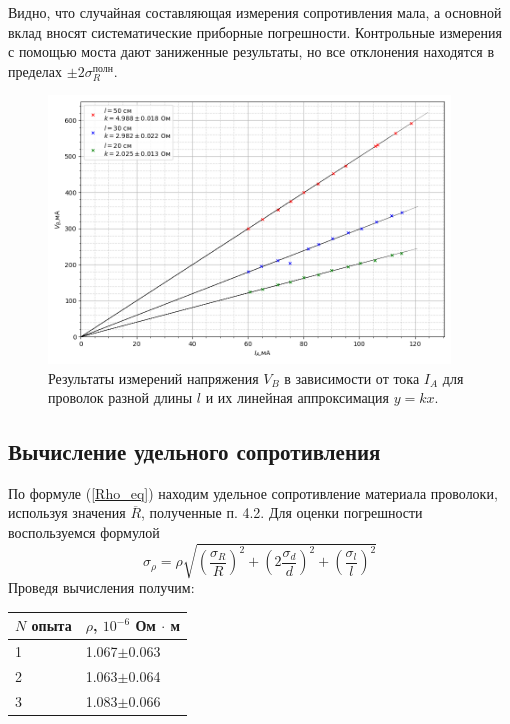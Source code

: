 \documentclass[12pt,a4paper]{article}
\begin{document}
Видно, что случайная составляющая измерения сопротивления мала, а основной вклад вносят систематические приборные погрешности. Контрольные измерения с помощью моста дают
заниженные результаты, но все отклонения находятся в пределах $\pm2 \sigma ^{полн} _{R}$.
\begin{figure}[htbp]
\includegraphics[width=0.95\textwidth]{imgs/graphic.png}
\caption{Результаты измерений напряжения $V_B$ в зависимости от тока $I_A$ для проволок разной длины $l$ и
их линейная аппроксимация $y=kx$.}
\label{fig:graphic}
\end{figure}

\subsection{ Вычисление удельного сопротивления}
По формуле (\ref{Rho_eq}) находим удельное сопротивление материала проволоки, используя значения
$\overline{R}$, полученные п. 4.2. Для оценки погрешности воспользуемся формулой
\begin{equation}
    \sigma _{\rho} = \rho\sqrt{ \left( \frac{\sigma _R}{R} \right)^2 + \left( 2\frac{\sigma _d}{d} \right)^2 +\left( \frac{\sigma _l}{l} \right)^2 }
\end{equation}
Проведя вычисления получим:
\begin{table}[!ht]
    \quad\quad\begin{tabular}{|l|l|}
    \hline
    $N$ опыта & $\rho$, $10^{-6}$ Ом $\cdot$ м \\ \hline
    1 & 1.067$\pm$0.063\\ \hline
    2 & 1.063$\pm$0.064\\ \hline
    3 & 1.083$\pm$0.066\\ 
    \hline
    \end{tabular}
\end{table}
\end{document}
